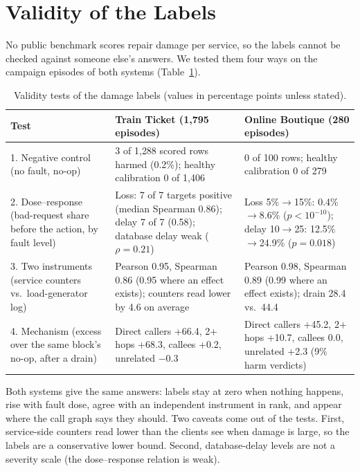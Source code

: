 \documentclass[10pt,conference]{IEEEtran}
\begin{document}
\section{Validity of the Labels}\label{sec:valid}
No public benchmark scores repair damage per service, so the labels cannot be checked against someone else's answers. We tested them four ways on the campaign episodes of both systems (Table~\ref{tab:valid}).

\begin{table}[t]
\centering
\caption{Validity tests of the damage labels (values in percentage points unless stated).}
\label{tab:valid}
\small
\begin{tabular}{@{}p{2.6cm}p{6.2cm}p{6.6cm}@{}}
\toprule
Test & Train Ticket (1{,}795 episodes) & Online Boutique (280 episodes) \\
\midrule
1. Negative control (no fault, no-op) & 3 of 1{,}288 scored rows harmed (0.2\%); healthy calibration 0 of 1{,}406 & 0 of 100 rows; healthy calibration 0 of 279 \\
2. Dose--response (bad-request share before the action, by fault level) & Loss: 7 of 7 targets positive (median Spearman 0.86); delay 7 of 7 (0.58); database delay weak ($\rho=0.21$) & Loss 5\%$\to$15\%: 0.4\%$\to$8.6\% ($p<10^{-10}$); delay 10$\to$25: 12.5\%$\to$24.9\% ($p=0.018$) \\
3. Two instruments (service counters vs.\ load-generator log) & Pearson 0.95, Spearman 0.86 (0.95 where an effect exists); counters read lower by 4.6 on average & Pearson 0.98, Spearman 0.89 (0.99 where an effect exists); drain 28.4 vs.\ 44.4 \\
4. Mechanism (excess over the same block's no-op, after a drain) & Direct callers +66.4, 2+ hops +68.3, callees +0.2, unrelated $-0.3$ & Direct callers +45.2, 2+ hops +10.7, callees 0.0, unrelated +2.3 (9\% harm verdicts) \\
\bottomrule
\end{tabular}
\end{table}

Both systems give the same answers: labels stay at zero when nothing happens, rise with fault dose, agree with an independent instrument in rank, and appear where the call graph says they should. Two caveats come out of the tests. First, service-side counters read lower than the clients see when damage is large, so the labels are a conservative lower bound. Second, database-delay levels are not a severity scale (the dose--response relation is weak).
\end{document}

